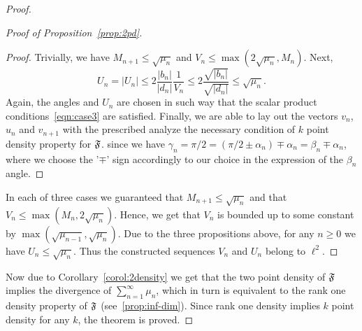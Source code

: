 \begin{proof}
\begin{proof}[Proof of Proposition~\ref{prop:2pd}]
\begin{proof}
            Trivially, we have $M_{n+1} \leq \sqrt{\mu_n}$ and $V_n \leq \max(2\sqrt{\mu_n}, M_n)$.
            Next,
            \[
              U_n = |U_n| \leq 2 \frac{|b_n|}{|d_n|} \frac{1}{V_n} \leq 2 \frac{\sqrt{|b_n|}}{\sqrt{|d_n|}} \leq \sqrt{\mu_n}.
            \]
            Again, the angles and $U_n$ are chosen in such way that the scalar product conditions~\eqref{eqn:case3} are satisfied.
            Finally, we are able to lay out the vectors $v_n$, $u_n$ and $v_{n+1}$ with the prescribed  analyze the necessary condition of $k$ point density property for $\mathfrak{F}$.
              since we have $\gamma_n = \pi/2 = (\pi/2 \pm \alpha_n) \mp \alpha_n = \beta_n \mp \alpha_n$,
              where we choose the '$\mp$' sign accordingly to our choice in the expression of the $\beta_n$ angle.
          \end{proof}
        In each of three cases we guaranteed that $M_{n+1} \leq \sqrt{\mu_n}$ and that $V_n \leq \max(M_n, 2\sqrt{\mu_n})$.
        Hence, we get that $V_n$ is bounded up to some constant by $\max(\sqrt{\mu_{n-1}}, \sqrt{\mu_n})$.
        Due to the three propositions above, for any $n \geq 0$ we have $U_n \leq \sqrt{\mu_n}$.
        Thus the constructed sequences $V_n$ and $U_n$ belong to $\ell^2$.
      \end{proof}
      Now due to Corollary~\ref{corol:2density} we get that the two point density of $\mathfrak{F}$ implies the divergence of $\sum_{n=1}^\infty \mu_n$,
        which in turn is equivalent to the rank one density property of $\mathfrak{F}$ (see~\ref{prop:inf-dim}).
      Since rank one density implies $k$ point density for any $k$, the theorem is proved.
    \end{proof}
